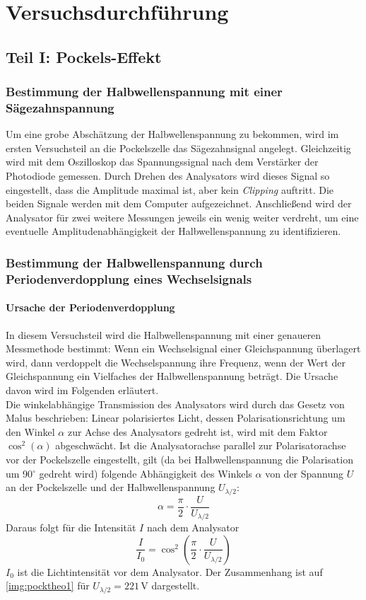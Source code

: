 \section{Versuchsdurchführung}
\subsection{Teil I: Pockels-Effekt}
\subsubsection{Bestimmung der Halbwellenspannung mit einer Sägezahnspannung}
Um eine grobe Abschätzung der Halbwellenspannung zu bekommen,
wird im ersten Versuchsteil an die Pockelszelle das Sägezahnsignal angelegt.
Gleichzeitig wird mit dem Oszilloskop das Spannungssignal nach dem Verstärker der Photodiode gemessen.
Durch Drehen des Analysators wird dieses Signal so eingestellt,
dass die Amplitude maximal ist, aber kein \emph{Clipping} auftritt.
Die beiden Signale werden mit dem Computer aufgezeichnet.
Anschließend wird der Analysator für zwei weitere Messungen jeweils ein wenig weiter verdreht,
um eine eventuelle Amplitudenabhängigkeit der Halbwellenspannung zu identifizieren. 


\subsubsection{Bestimmung der Halbwellenspannung durch Periodenverdopplung eines Wechselsignals}

\paragraph{Ursache der Periodenverdopplung}
In diesem Versuchsteil wird die Halbwellenspannung mit einer genaueren Messmethode bestimmt:
Wenn ein Wechselsignal einer Gleichspannung überlagert wird,
dann verdoppelt die Wechselspannung ihre Frequenz,
wenn der Wert der Gleichspannung ein Vielfaches der Halbwellenspannung beträgt.
Die Ursache davon wird im Folgenden erläutert.\\
Die winkelabhängige Transmission des Analysators wird durch das Gesetz von Malus beschrieben:
Linear polarisiertes Licht, dessen Polarisationsrichtung um den Winkel $\alpha$ zur Achse des Analysators
gedreht ist, wird mit dem Faktor $\cos^2(\alpha)$ abgeschwächt.
Ist die Analysatorachse parallel zur Polarisatorachse vor der Pockelszelle eingestellt,
gilt (da bei Halbwellenspannung die Polarisation um 90$^\circ$ gedreht wird)
folgende Abhängigkeit des Winkels $\alpha$ von der Spannung $U$ an der Pockelszelle
und der Halbwellenspannung $U_{\lambda / 2}$:
\begin{equation}
\label{}
  \alpha = \frac{\pi}{2} \cdot \frac{U}{U_{\lambda / 2}}
\end{equation}
Daraus folgt für die Intensität $I$ nach dem Analysator
\begin{equation}
\label{eq:int}
  \frac{I}{I_0}=\cos^2(\frac{\pi}{2} \cdot \frac{U}{U_{\lambda / 2}})
\end{equation}
$I_0$ ist die Lichtintensität vor dem Analysator. Der Zusammenhang ist auf \autoref{img:pocktheo1}
für $U_{\lambda / 2}=221\,$V dargestellt.

